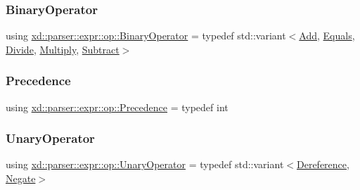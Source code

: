 \subsubsection{\texorpdfstring{Binary\+Operator}{BinaryOperator}}
{\footnotesize\ttfamily using \mbox{\hyperlink{namespacexd_1_1parser_1_1expr_1_1op_a5d85beecf0ae4a43576fdeacb264886a}{xd\+::parser\+::expr\+::op\+::\+Binary\+Operator}} = typedef std\+::variant$<$\mbox{\hyperlink{structxd_1_1parser_1_1expr_1_1op_1_1_add}{Add}}, \mbox{\hyperlink{structxd_1_1parser_1_1expr_1_1op_1_1_equals}{Equals}}, \mbox{\hyperlink{structxd_1_1parser_1_1expr_1_1op_1_1_divide}{Divide}}, \mbox{\hyperlink{structxd_1_1parser_1_1expr_1_1op_1_1_multiply}{Multiply}}, \mbox{\hyperlink{structxd_1_1parser_1_1expr_1_1op_1_1_subtract}{Subtract}}$>$}

\mbox{\label{namespacexd_1_1parser_1_1expr_1_1op_ae27abd4a02cd8125663cb2bacac299b2}} 
\subsubsection{\texorpdfstring{Precedence}{Precedence}}
{\footnotesize\ttfamily using \mbox{\hyperlink{namespacexd_1_1parser_1_1expr_1_1op_ae27abd4a02cd8125663cb2bacac299b2}{xd\+::parser\+::expr\+::op\+::\+Precedence}} = typedef int}

\mbox{\label{namespacexd_1_1parser_1_1expr_1_1op_ac61563bdf571a06b442d1fe819ff75bd}} 
\subsubsection{\texorpdfstring{Unary\+Operator}{UnaryOperator}}
{\footnotesize\ttfamily using \mbox{\hyperlink{namespacexd_1_1parser_1_1expr_1_1op_ac61563bdf571a06b442d1fe819ff75bd}{xd\+::parser\+::expr\+::op\+::\+Unary\+Operator}} = typedef std\+::variant$<$\mbox{\hyperlink{structxd_1_1parser_1_1expr_1_1op_1_1_dereference}{Dereference}}, \mbox{\hyperlink{structxd_1_1parser_1_1expr_1_1op_1_1_negate}{Negate}}$>$}



